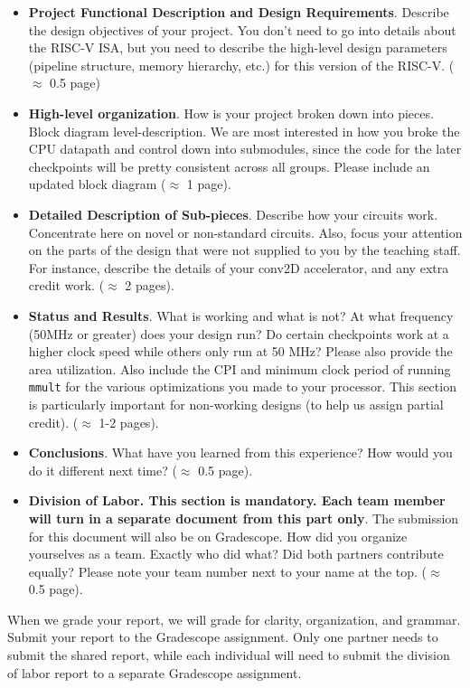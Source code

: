 \documentclass[11pt]{article}
\begin{document}
\begin{itemize}
  \item \textbf{Project Functional Description and Design Requirements}. Describe the design objectives of your project.  You don't need to go into details about the RISC-V ISA, but you need to describe the high-level design parameters (pipeline structure, memory hierarchy, etc.) for this version of the RISC-V. ($\approx$ 0.5 page)
  \item \textbf{High-level organization}. How is your project broken down into pieces. Block diagram level-description. We are most interested in how you broke the CPU datapath and control
  down into submodules, since the code for the later checkpoints will be pretty consistent across all groups. Please include an updated block diagram ($\approx$ 1 page).
  \item \textbf{Detailed Description of Sub-pieces}. Describe how your circuits work. Concentrate here on novel or non-standard circuits. Also, focus your attention on the parts of the design that were not supplied to you by the teaching staff. For instance, describe the details of your conv2D accelerator, and any extra credit work. ($\approx$ 2 pages).
  \item \textbf{Status and Results}. What is working and what is not? At what frequency (50MHz or greater) does your design run? Do certain checkpoints work at a higher clock speed while others only run at 50 MHz? Please also provide the area utilization. Also include the CPI and minimum clock period of running \verb|mmult| for the various optimizations you made to your processor. This section is particularly important for non-working designs (to help us assign partial credit). ($\approx$ 1-2 pages).
  \item \textbf{Conclusions}. What have you learned from this experience? How would you do it different next time? ($\approx$ 0.5 page).
  \item \textbf{Division of Labor. This section is mandatory. Each team member will turn in a separate document from this part only}. The submission for this document will also be on Gradescope. How did you organize yourselves as a team. Exactly who did what? Did both partners contribute equally? Please note your team number next to your name at the top. ($\approx$ 0.5 page).
\end{itemize}

When we grade your report, we will grade for clarity, organization, and grammar.
Submit your report to the Gradescope assignment.
Only one partner needs to submit the shared report, while each individual will need to submit the division of labor report to a separate Gradescope assignment.
\end{document}
